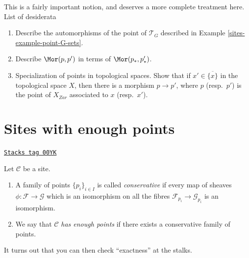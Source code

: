 \medskip\noindent
This is a fairly important notion, and deserves a more complete
treatment here. List of desiderata
\begin{enumerate}
\item Describe the automorphisms of the point of $\mathcal{T}_G$
described in Example \ref{sites-example-point-G-sets}.
\item Describe $\Mor(p, p')$ in terms of  $\Mor(p_*, p'_*)$.
\item Specialization of points in topological spaces.
Show that if $x' \in \overline{\{x\}}$ in the topological space
$X$, then there is a morphism $p \to p'$, where $p$ (resp.\ $p'$)
is the point of $X_{Zar}$ associated to $x$ (resp.\ $x'$).
\end{enumerate}

\section{Sites with enough points}
\label{sites-section-sites-enough-points}
\begin{definition}
\label{sites-definition-enough-points}
\href{https://stacks.math.columbia.edu/tag/00YK}{\texttt{Stacks tag 00YK}}

Let $\mathcal{C}$ be a site.
\begin{enumerate}
\item A family of points $\{p_i\}_{i\in I}$ is called {\it conservative}
if every map of sheaves $\phi : \mathcal{F} \to \mathcal{G}$
which is an isomorphism on all the fibres $\mathcal{F}_{p_i}
\to \mathcal{G}_{p_i}$ is an isomorphism.
\item  We say that $\mathcal{C}$ {\it has enough points}
if there exists a conservative family of points.
\end{enumerate}
\end{definition}

It turns out that you can then check ``exactness'' at the stalks.

